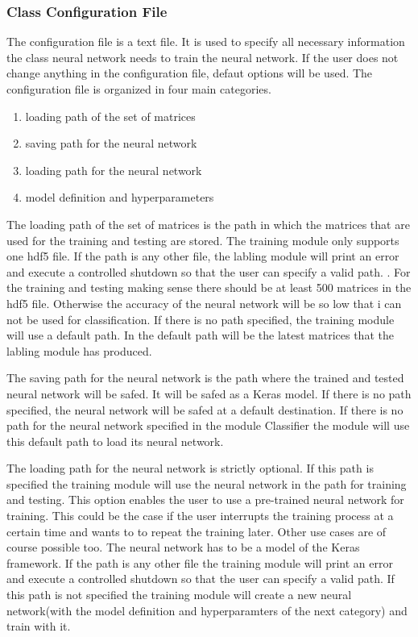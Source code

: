 \documentclass[parskip=full]{scrartcl}
\begin{document}
\subsubsection{Class Configuration File}
The configuration file is a text file.
It is used to specify all necessary information the class neural network needs to train the neural network.
If the user does not change anything in the configuration file, defaut options will be used. The configuration file is organized in four main categories.
\begin{enumerate}
\item loading path of the set of matrices 
\item saving path for the neural network
\item loading path for the neural network
\item model definition and hyperparameters
\end{enumerate}
The loading path of the set of matrices is the path in which the matrices that are used for the training and testing are stored.
The training module only supports one hdf5 file.
If the path is any other file, the labling module will print an error and execute a controlled shutdown so that the user can specify a valid path. .
For the training and testing making sense there should be at least 500 matrices in the hdf5 file.
Otherwise the accuracy of the neural network will be so low that i can not be used for classification.
If there is no path specified, the training module will use a default path.
In the default path will be the latest matrices that the labling module has produced. \newline

The saving path for the neural network is the path where the trained and tested neural network will be safed.
It will be safed as a Keras model.
If there is no path specified, the neural network will be safed at a default destination.
If there is no path for the neural network specified in the module Classifier the module will use this default path to load its neural network.\newline

The loading path for the neural network is strictly optional.
If this path is specified the training module will use the neural network in the path for training and testing.
This option enables the user to use a pre-trained neural network for training.
This could be the case if the user interrupts the training process at a certain time and wants to to repeat the training later.
Other use cases are of course possible too.
The neural network has to be a model of the Keras framework. If the path is any other file the training module will print an error and execute a controlled shutdown so that the user can specify a valid path.
If this path is not specified the training module will create a new neural network(with the model definition and hyperparamters of the next category) and train with it. \newline
\end{document}
